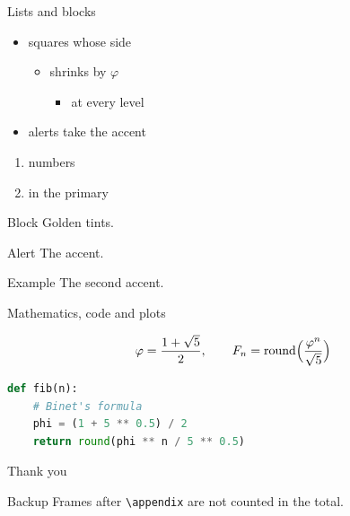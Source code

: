 \documentclass[11pt]{beamer}
\begin{document}
\begin{frame}{Lists and blocks}
  \begin{goldencolumns}
    \begin{itemize}
      \item squares whose side
      \begin{itemize}
        \item shrinks by \(\varphi\)
        \begin{itemize}
          \item at every level
        \end{itemize}
      \end{itemize}
      \item \alert{alerts} take the accent
    \end{itemize}
    \begin{enumerate}
      \item numbers
      \item in the primary
    \end{enumerate}
    \nextcolumn
    \begin{block}{Block}
      Golden tints.
    \end{block}
    \begin{alertblock}{Alert}
      The accent.
    \end{alertblock}
    \begin{exampleblock}{Example}
      The second accent.
    \end{exampleblock}
  \end{goldencolumns}
\end{frame}

\begin{frame}[fragile]{Mathematics, code and plots}
  \begin{goldencolumns}
    \[
      \varphi = \frac{1 + \sqrt{5}}{2}, \qquad
      F_n = \operatorname{round}\Bigl(\frac{\varphi^n}{\sqrt{5}}\Bigr)
    \]
\begin{lstlisting}[language=Python]
def fib(n):
    # Binet's formula
    phi = (1 + 5 ** 0.5) / 2
    return round(phi ** n / 5 ** 0.5)
\end{lstlisting}
    \nextcolumn
  \end{goldencolumns}
\end{frame}

\begin{frame}[standout]
  Thank you
\end{frame}

\appendix

\begin{frame}{Backup}
  Frames after \texttt{\textbackslash appendix} are not counted in the
  total.
\end{frame}
\end{document}
